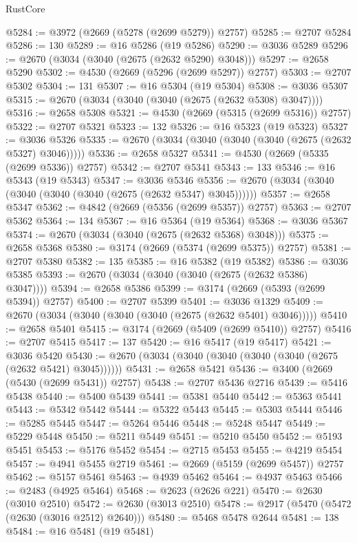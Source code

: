 \begin{lexlean}{RustCore}
\begin{coremodule}
@5284 := @3972 (@2669 (@5278 (@2699 @5279)) @2757)
@5285 := @2707 @5284
@5286 := 130
@5289 := @16 @5286 (@19 @5286)
@5290 := @3036 @5289
@5296 := @2670 (@3034 (@3040 (@2675 (@2632 @5290) @3048)))
@5297 := @2658 @5290
@5302 := @4530 (@2669 (@5296 (@2699 @5297)) @2757)
@5303 := @2707 @5302
@5304 := 131
@5307 := @16 @5304 (@19 @5304)
@5308 := @3036 @5307
@5315 := @2670 (@3034 (@3040 (@3040 (@2675 (@2632 @5308) @3047))))
@5316 := @2658 @5308
@5321 := @4530 (@2669 (@5315 (@2699 @5316)) @2757)
@5322 := @2707 @5321
@5323 := 132
@5326 := @16 @5323 (@19 @5323)
@5327 := @3036 @5326
@5335 := @2670 (@3034 (@3040 (@3040 (@3040 (@2675 (@2632 @5327) @3046)))))
@5336 := @2658 @5327
@5341 := @4530 (@2669 (@5335 (@2699 @5336)) @2757)
@5342 := @2707 @5341
@5343 := 133
@5346 := @16 @5343 (@19 @5343)
@5347 := @3036 @5346
@5356 := @2670 (@3034 (@3040 (@3040 (@3040 (@3040 (@2675 (@2632 @5347) @3045))))))
@5357 := @2658 @5347
@5362 := @4842 (@2669 (@5356 (@2699 @5357)) @2757)
@5363 := @2707 @5362
@5364 := 134
@5367 := @16 @5364 (@19 @5364)
@5368 := @3036 @5367
@5374 := @2670 (@3034 (@3040 (@2675 (@2632 @5368) @3048)))
@5375 := @2658 @5368
@5380 := @3174 (@2669 (@5374 (@2699 @5375)) @2757)
@5381 := @2707 @5380
@5382 := 135
@5385 := @16 @5382 (@19 @5382)
@5386 := @3036 @5385
@5393 := @2670 (@3034 (@3040 (@3040 (@2675 (@2632 @5386) @3047))))
@5394 := @2658 @5386
@5399 := @3174 (@2669 (@5393 (@2699 @5394)) @2757)
@5400 := @2707 @5399
@5401 := @3036 @1329
@5409 := @2670 (@3034 (@3040 (@3040 (@3040 (@2675 (@2632 @5401) @3046)))))
@5410 := @2658 @5401
@5415 := @3174 (@2669 (@5409 (@2699 @5410)) @2757)
@5416 := @2707 @5415
@5417 := 137
@5420 := @16 @5417 (@19 @5417)
@5421 := @3036 @5420
@5430 := @2670 (@3034 (@3040 (@3040 (@3040 (@3040 (@2675 (@2632 @5421) @3045))))))
@5431 := @2658 @5421
@5436 := @3400 (@2669 (@5430 (@2699 @5431)) @2757)
@5438 := @2707 @5436 @2716
@5439 := @5416 @5438
@5440 := @5400 @5439
@5441 := @5381 @5440
@5442 := @5363 @5441
@5443 := @5342 @5442
@5444 := @5322 @5443
@5445 := @5303 @5444
@5446 := @5285 @5445
@5447 := @5264 @5446
@5448 := @5248 @5447
@5449 := @5229 @5448
@5450 := @5211 @5449
@5451 := @5210 @5450
@5452 := @5193 @5451
@5453 := @5176 @5452
@5454 := @2715 @5453
@5455 := @4219 @5454
@5457 := @4941 @5455 @2719
@5461 := @2669 (@5159 (@2699 @5457)) @2757
@5462 := @5157 @5461
@5463 := @4939 @5462
@5464 := @4937 @5463
@5466 := @2483 (@4925 @5464)
@5468 := @2623 (@2626 @221)
@5470 := @2630 (@3010 @2510)
@5472 := @2630 (@3013 @2510)
@5478 := @2917 (@5470 (@5472 (@2630 (@3016 @2512) @2640)))
@5480 := @5468 @5478 @2644
@5481 := 138
@5484 := @16 @5481 (@19 @5481)

\end{coremodule}
\end{lexlean}
